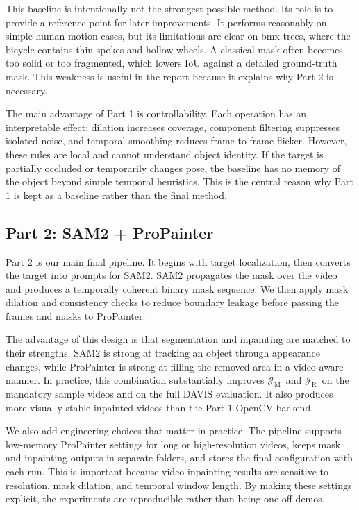 \documentclass[10pt,twocolumn,letterpaper]{article}
\newcommand{\jm}{\ensuremath{\mathcal{J}_{\mathrm{M}}}}
\newcommand{\jr}{\ensuremath{\mathcal{J}_{\mathrm{R}}}}
\begin{document}
This baseline is intentionally not the strongest possible method. Its role is to provide a reference point for later improvements. It performs reasonably on simple human-motion cases, but its limitations are clear on bmx-trees, where the bicycle contains thin spokes and hollow wheels. A classical mask often becomes too solid or too fragmented, which lowers IoU against a detailed ground-truth mask. This weakness is useful in the report because it explains why Part 2 is necessary.

The main advantage of Part 1 is controllability. Each operation has an interpretable effect: dilation increases coverage, component filtering suppresses isolated noise, and temporal smoothing reduces frame-to-frame flicker. However, these rules are local and cannot understand object identity. If the target is partially occluded or temporarily changes pose, the baseline has no memory of the object beyond simple temporal heuristics. This is the central reason why Part 1 is kept as a baseline rather than the final method.

\subsection{Part 2: SAM2 + ProPainter}
Part 2 is our main final pipeline. It begins with target localization, then converts the target into prompts for SAM2. SAM2 propagates the mask over the video and produces a temporally coherent binary mask sequence. We then apply mask dilation and consistency checks to reduce boundary leakage before passing the frames and masks to ProPainter.

The advantage of this design is that segmentation and inpainting are matched to their strengths. SAM2 is strong at tracking an object through appearance changes, while ProPainter is strong at filling the removed area in a video-aware manner. In practice, this combination substantially improves \jm\ and \jr\ on the mandatory sample videos and on the full DAVIS evaluation. It also produces more visually stable inpainted videos than the Part 1 OpenCV backend.

We also add engineering choices that matter in practice. The pipeline supports low-memory ProPainter settings for long or high-resolution videos, keeps mask and inpainting outputs in separate folders, and stores the final configuration with each run. This is important because video inpainting results are sensitive to resolution, mask dilation, and temporal window length. By making these settings explicit, the experiments are reproducible rather than being one-off demos.
\end{document}
